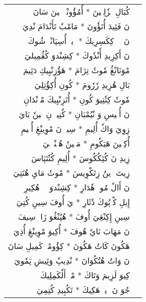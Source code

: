 \documentclass[a4paper, 12pt]{report}
\begin{document}
\begin{longtable}{rl}
\textarabic{كُبَالِ مٖزٗلِنٖينَ  *  أُمُؤُونْڠٖ تٖينَ سَانَ} & \\ 
\textarabic{نَ فَئِيدَ أُتَؤٗونَ  *  مَامْبٗ تَأَنْدَامَ نْدِيَ} & \\ 
[8mm] 

\textarabic{نَ يٖيٖ كِكَسِرِيكَ  *  وٖيوٖ أُسِپَانْدٖ شُوكَ} & \\ 
\textarabic{نَ أَكِزِيدِ أٗنْدٗوكَ  *  كِشِنْدوَ كُڤُمِيليَ} & \\ 
[8mm] 

\textarabic{مْوَنَانْڠُ مٗوتٗ تِزَامَ  *  هَؤُزِنْيِيكِ دَئِيمَ} & \\ 
\textarabic{بَالِ هُزِيدِ رٗرٗومَ  *  كُونِ أُكِؤُتِلِيَ} & \\ 
[8mm] 

\textarabic{مٗوتٗ كِتٗتِيوَ كُونِ  *  أُتَزِنْيِيكَ مْوٖنْدَانِ} & \\ 
\textarabic{نَ أُتٖيسِ وَ نْيُمْبَانِ  *  كُنِيزٖ نِ نٖينٗ بَايَ} & \\ 
[8mm] 

\textarabic{زِوِيَ وَاكٗ أُلِيمِ  *  سِيوٖ نَ مْوِينْڠِ أُسٖيمِ} & \\ 
\textarabic{أُكِنٖينَ هَيَكٗومِ  *  مَنٖينٗ هُئٖنْدٖلٖيَ} & \\ 
[8mm] 

\textarabic{زِيدِ نَ كُئِكُكُوسَ  *  أُلِيمِ كُتٗتَپَاسَ} & \\ 
\textarabic{زِيتَ زٖينُ زِتَكْوِيسَ  *  مٗوتٗ مَايِ هُتَتِيَ} & \\ 
[8mm] 

\textarabic{نَ أَالٗ مُومٖ هٗدَارِ  *  كِشِنْدوَ يٖيٖ هُكِيرِ} & \\ 
\textarabic{إِيلِ كْوٖپُوكَ دٗثَارِ  *  يَ أُوفَ سِينِ كُتِيَ} & \\ 
[8mm] 

\textarabic{سِينِ إِكِنْڠِيَ أُوفَ  *  هُپُنْڠُوَ زَاكٖ سِيفَ} & \\ 
\textarabic{نَ مَهَابَ نَايٗ هُوفَ  *  أُكِيوَ مْوِينْڠِ أُذِيَ} & \\ 
[8mm] 

\textarabic{هَكُونَ كَاتُ هَكُونَ  *  كِؤُومْبٖ كَمِيلِ سَانَ} & \\ 
\textarabic{نَ وَاتُ هُتُكُوَانَ  *  نْدِيپٗ وَئِيشِ پَمٗويَ} & \\ 
[8mm] 

\textarabic{كِيوَ لَزِيمَ وَتَاكَ  *  مْكٖ أَلٗكَمِلِيكَ} & \\ 
\textarabic{جُوَ نَ وٖيوٖ هَكِيكَ  *  تَكُبِيدِ كُتِمِيَ} & \\ 
[8mm] 


\end{longtable}
\end{document}
